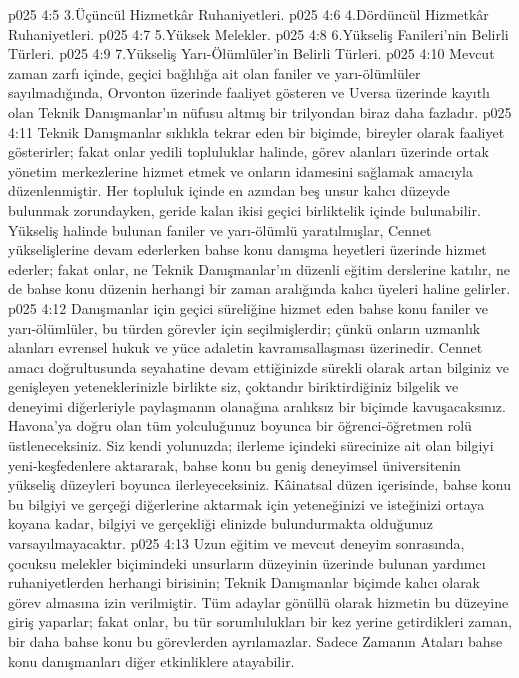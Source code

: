 \vs p025 4:5 3.\bibnobreakspace Üçüncül Hizmetkâr Ruhaniyetleri.
\vs p025 4:6 4.\bibnobreakspace Dördüncül Hizmetkâr Ruhaniyetleri.
\vs p025 4:7 5.\bibnobreakspace Yüksek Melekler.
\vs p025 4:8 6.\bibnobreakspace Yükseliş Fanileri’nin Belirli Türleri.
\vs p025 4:9 7.\bibnobreakspace Yükseliş Yarı\hyp{}Ölümlüler’in Belirli Türleri.
\vs p025 4:10 Mevcut zaman zarfı içinde, geçici bağlılığa ait olan faniler ve yarı\hyp{}ölümlüler sayılmadığında, Orvonton üzerinde faaliyet gösteren ve Uversa üzerinde kayıtlı olan Teknik Danışmanlar’ın nüfusu altmış bir trilyondan biraz daha fazladır.
\vs p025 4:11 Teknik Danışmanlar sıklıkla tekrar eden bir biçimde, bireyler olarak faaliyet gösterirler; fakat onlar yedili topluluklar halinde, görev alanları üzerinde ortak yönetim merkezlerine hizmet etmek ve onların idamesini sağlamak amacıyla düzenlenmiştir. Her topluluk içinde en azından beş unsur kalıcı düzeyde bulunmak zorundayken, geride kalan ikisi geçici birliktelik içinde bulunabilir. Yükseliş halinde bulunan faniler ve yarı\hyp{}ölümlü yaratılmışlar, Cennet yükselişlerine devam ederlerken bahse konu danışma heyetleri üzerinde hizmet ederler; fakat onlar, ne Teknik Danışmanlar’ın düzenli eğitim derslerine katılır, ne de bahse konu düzenin herhangi bir zaman aralığında kalıcı üyeleri haline gelirler.
\vs p025 4:12 Danışmanlar için geçici süreliğine hizmet eden bahse konu faniler ve yarı\hyp{}ölümlüler, bu türden görevler için seçilmişlerdir; çünkü onların uzmanlık alanları evrensel hukuk ve yüce adaletin kavramsallaşması üzerinedir. Cennet amacı doğrultusunda seyahatine devam ettiğinizde sürekli olarak artan bilginiz ve genişleyen yeteneklerinizle birlikte siz, çoktandır biriktirdiğiniz bilgelik ve deneyimi diğerleriyle paylaşmanın olanağına aralıksız bir biçimde kavuşacaksınız. Havona’ya doğru olan tüm yolculuğunuz boyunca bir öğrenci\hyp{}öğretmen rolü üstleneceksiniz. Siz kendi yolunuzda; ilerleme içindeki sürecinize ait olan bilgiyi yeni\hyp{}keşfedenlere aktararak, bahse konu bu geniş deneyimsel üniversitenin yükseliş düzeyleri boyunca ilerleyeceksiniz. Kâinatsal düzen içerisinde, bahse konu bu bilgiyi ve gerçeği diğerlerine aktarmak için yeteneğinizi ve isteğinizi ortaya koyana kadar, bilgiyi ve gerçekliği elinizde bulundurmakta olduğunuz varsayılmayacaktır.
\vs p025 4:13 Uzun eğitim ve mevcut deneyim sonrasında, çocuksu melekler biçimindeki unsurların düzeyinin üzerinde bulunan yardımcı ruhaniyetlerden herhangi birisinin; Teknik Danışmanlar biçimde kalıcı olarak görev almasına izin verilmiştir. Tüm adaylar gönüllü olarak hizmetin bu düzeyine giriş yaparlar; fakat onlar, bu tür sorumlulukları bir kez yerine getirdikleri zaman, bir daha bahse konu bu görevlerden ayrılamazlar. Sadece Zamanın Ataları bahse konu danışmanları diğer etkinliklere atayabilir.
